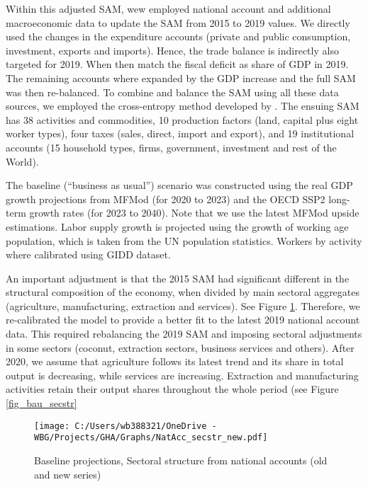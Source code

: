\documentclass[11pt,english]{article}
\begin{document}
Within this adjusted SAM, wew employed national account and additional macroeconomic data to update the SAM from 2015 to 2019 values. We directly used the changes in the expenditure accounts (private and public consumption, investment, exports and imports). Hence, the trade balance is indirectly also targeted for 2019. When then match the fiscal deficit as share of GDP in 2019. The remaining accounts where expanded by the GDP increase and the full SAM was then re-balanced. To combine and balance the SAM using all these data sources, we employed the cross-entropy method developed by \citet{Robinson_etal_2001}. The ensuing SAM has 38 activities and commodities, 10 production factors (land, capital plus eight worker types), four taxes (sales, direct, import and export), and 19 institutional accounts (15 household types, firms, government, investment and rest of the World).  

The baseline (``business as usual'') scenario was constructed using the real GDP growth projections from MFMod (for 2020 to 2023) and the OECD SSP2 long-term growth rates (for 2023 to 2040). Note that we use the latest MFMod upside estimations. Labor supply growth is projected using the growth of working age population, which is taken from the UN population statistics. Workers by activity where calibrated using GIDD dataset. 

An important adjustment is that the 2015 SAM had significant different in the structural composition of the economy, when divided by main sectoral aggregates (agriculture, manufacturing, extraction and services). See Figure \ref{fig_NatAcc_secstr}. Therefore, we re-calibrated the model to provide a better fit to the latest 2019 national account data. This required rebalancing the 2019 SAM and imposing sectoral adjustments in some sectors (coconut, extraction sectors, business services and others). After 2020, we assume that agriculture follows its latest trend and its share in total output is decreasing, while services are increasing. Extraction and manufacturing activities retain their output shares throughout the whole period (see Figure \ref{fig_bau_secstr}


\begin{figure}[ht!]\caption{Baseline projections, Sectoral structure from national accounts (old and new series)}  \label{fig_NatAcc_secstr}
	\centering
	\texttt{[image: C:/Users/wb388321/OneDrive - WBG/Projects/GHA/Graphs/NatAcc\_secstr\_new.pdf]}
\end{figure}
\end{document}
